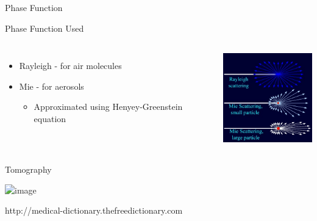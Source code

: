 \documentclass[compress,red,12pt]{beamer}
\begin{document}

\begin{frame}{Phase Function}
    \begin{overprint}
      {\centerline{\def\svgwidth{0.5\linewidth}\small{}}}
      {\centerline{\def\svgwidth{0.5\linewidth}\small{}}}
      {\centerline{\def\svgwidth{0.5\linewidth}\small{}}}
    \end{overprint}  
\end{frame}


\begin{frame}[T]{Phase Function Used}
  \begin{columns}[T]
    \begin{itemize}
    \item Rayleigh - for air molecules
    \item Mie - for aerosols
      \begin{itemize}
      \item Approximated using Henyey-Greenstein equation
      \end{itemize}
    \end{itemize}
    \centering
    \includegraphics[height=4cm]{images/Mie_Rayleigh.jpg}
  \end{columns}
\end{frame}


\begin{frame}{Tomography}
  \begin{center}
    \includegraphics<1>[height=6cm]{images/ct.png}
  \end{center}
  
  \begin{flushright}
     {\tiny http://medical-dictionary.thefreedictionary.com}
  \end{flushright}
\end{frame}
\end{document}
